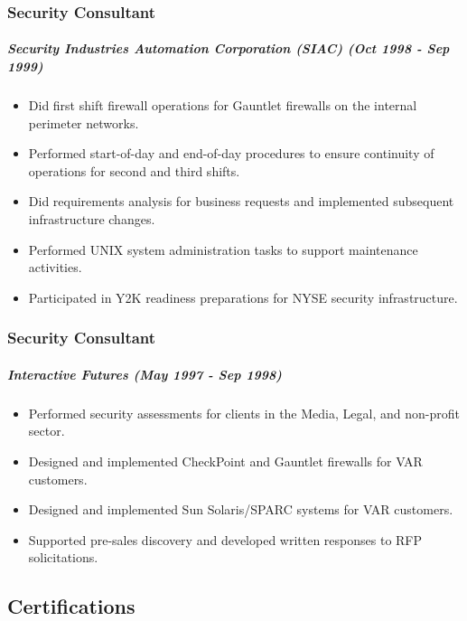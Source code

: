\documentclass[10pt,]{article}
\providecommand{\tightlist}{%
  \setlength{\itemsep}{0pt}\setlength{\parskip}{0pt}}
\let\oldsubparagraph\subparagraph
\renewcommand{\subparagraph}[1]{\oldsubparagraph{#1}\mbox{}}
\begin{document}
\subsubsection{Security Consultant}\label{security-consultant-1}

\subparagraph{\texorpdfstring{\emph{Security Industries Automation
Corporation (SIAC)} (Oct 1998 - Sep
1999)}{Security Industries Automation Corporation (SIAC) (Oct 1998 - Sep 1999)}}\label{security-industries-automation-corporation-siac-oct-1998---sep-1999}

\begin{itemize}
\tightlist
\item
  Did first shift firewall operations for Gauntlet firewalls on the
  internal perimeter networks.
\item
  Performed start-of-day and end-of-day procedures to ensure continuity
  of operations for second and third shifts.
\item
  Did requirements analysis for business requests and implemented
  subsequent infrastructure changes.
\item
  Performed UNIX system administration tasks to support maintenance
  activities.
\item
  Participated in Y2K readiness preparations for NYSE security
  infrastructure.
\end{itemize}

\subsubsection{Security Consultant}\label{security-consultant-2}

\subparagraph{\texorpdfstring{\emph{Interactive Futures} (May 1997 - Sep
1998)}{Interactive Futures (May 1997 - Sep 1998)}}\label{interactive-futures-may-1997---sep-1998}

\begin{itemize}
\tightlist
\item
  Performed security assessments for clients in the Media, Legal, and
  non-profit sector.
\item
  Designed and implemented CheckPoint and Gauntlet firewalls for VAR
  customers.
\item
  Designed and implemented Sun Solaris/SPARC systems for VAR customers.
\item
  Supported pre-sales discovery and developed written responses to RFP
  solicitations.
\end{itemize}

\subsection{Certifications}\label{certifications}
\end{document}

